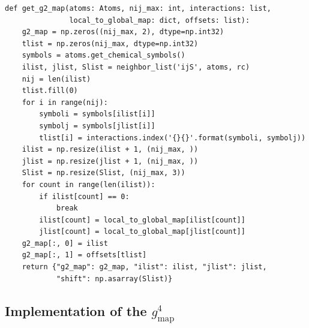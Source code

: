 \documentclass[prb,preprint]{revtex4-2}
\begin{document}
{\begin{verbatim}
def get_g2_map(atoms: Atoms, nij_max: int, interactions: list, 
               local_to_global_map: dict, offsets: list):
    g2_map = np.zeros((nij_max, 2), dtype=np.int32)
    tlist = np.zeros(nij_max, dtype=np.int32)
    symbols = atoms.get_chemical_symbols()
    ilist, jlist, Slist = neighbor_list('ijS', atoms, rc)
    nij = len(ilist)
    tlist.fill(0)
    for i in range(nij):
        symboli = symbols[ilist[i]]
        symbolj = symbols[jlist[i]]
        tlist[i] = interactions.index('{}{}'.format(symboli, symbolj))
    ilist = np.resize(ilist + 1, (nij_max, ))
    jlist = np.resize(jlist + 1, (nij_max, ))
    Slist = np.resize(Slist, (nij_max, 3))
    for count in range(len(ilist)):
        if ilist[count] == 0:
            break
        ilist[count] = local_to_global_map[ilist[count]]
        jlist[count] = local_to_global_map[jlist[count]]
    g2_map[:, 0] = ilist
    g2_map[:, 1] = offsets[tlist]
    return {"g2_map": g2_map, "ilist": ilist, "jlist": jlist, 
            "shift": np.asarray(Slist)}
\end{verbatim}

\newpage

\subsection{Implementation of the $g^4_{\mathrm{map}}$}

}
\end{document}
